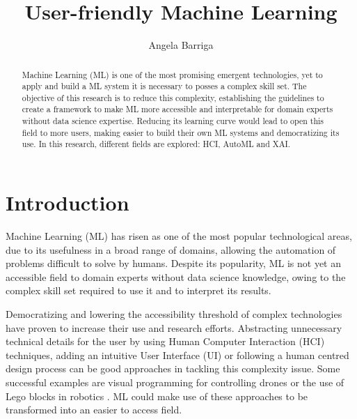 \documentclass[runningheads]{llncs}
\begin{document}
%
\title{User-friendly Machine Learning}
%
%
\author{Angela Barriga}
%
%
%
\maketitle              %
%
\begin{abstract}
Machine Learning (ML) is one of the most promising emergent technologies, yet to apply and build a ML system it is necessary to posses a complex skill set. The objective of this research is to reduce this complexity, establishing the guidelines to create a framework to make ML more accessible and interpretable for domain experts without data science expertise. Reducing its learning curve would lead to open this field to more users, making easier to build their own ML systems and democratizing its use. In this research, different fields are explored: HCI, AutoML and XAI.
\end{abstract}
%
%
%
\section{Introduction}\label{intro}

Machine Learning (ML) has risen as one of the most popular technological areas, due to its usefulness in a broad range of domains, allowing the automation of problems difficult to solve by humans. Despite its popularity, ML is not yet an accessible field to domain experts without data science knowledge, owing to the complex skill set required to use it and to interpret its results.  

Democratizing and lowering the accessibility threshold of complex technologies have proven to increase their use and research efforts. Abstracting unnecessary technical details for the user by using Human Computer Interaction (HCI) techniques, adding an intuitive User Interface (UI) or following a human centred design process can be good approaches in tackling this complexity issue. Some successful examples are visual programming for controlling drones \cite{dronely} or the use of Lego blocks in robotics \cite{lego}. ML could make use of these approaches to be transformed into an easier to access field. 
\end{document}
